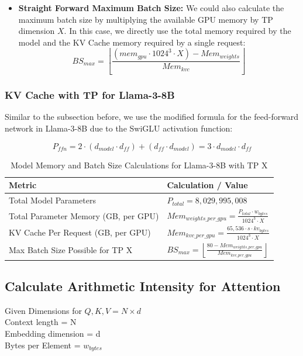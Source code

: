 \documentclass{article}
\begin{document}
\begin{itemize}
    \item \textbf{Straight Forward Maximum Batch Size:} We could also calculate the maximum batch size by multiplying the available GPU memory by TP dimension $X$. In this case, we directly use the total memory required by the model and the KV Cache memory required by a single request:
    $$BS_{max} = \left\lfloor \frac{(mem_{gpu} \cdot 1024^3 \cdot X) - Mem_{weights}}{Mem_{kvc}} \right\rfloor$$
\end{itemize}

\subsubsection{KV Cache with TP for Llama-3-8B}

Similar to the subsection before, we use the modified formula for the feed-forward network in Llama-3-8B due to the SwiGLU activation function:

$$P_{ffn} = 2 \cdot (d_{model} \cdot d_{ff}) + (d_{ff} \cdot d_{model}) = 3 \cdot d_{model} \cdot d_{ff}$$


\begin{table}[h]
\centering
\renewcommand{\arraystretch}{2.2} %
\begin{tabular}{|l|l|}
\hline
\textbf{Metric} & \textbf{Calculation / Value} \\ \hline
Total Model Parameters & $P_{total} = 8,029,995,008$ \\ \hline
Total Parameter Memory (GB, per GPU) & $\displaystyle Mem_{weights\_per\_gpu} = \frac{P_{total} \cdot w_{bytes}}{1024^3 \cdot X}$ \\ \hline
KV Cache Per Request (GB, per GPU) & $\displaystyle Mem_{kvc\_per\_gpu} = \frac{65,536 \cdot s \cdot kv_{bytes}}{1024^3 \cdot X}$ \\ \hline
Max Batch Size Possible for TP X & $\displaystyle BS_{max} = \left\lfloor \frac{80 - Mem_{weights\_per\_gpu}}{Mem_{kvc\_per\_gpu}} \right\rfloor$ \\ \hline
\end{tabular}
\caption{Model Memory and Batch Size Calculations for Llama-3-8B with TP X}
\end{table}

\subsection{Calculate Arithmetic Intensity for Attention}

Given Dimensions for $Q, K, V = N \times d$ \\
Context length = N \\
Embedding dimension = d \\
Bytes per Element = $w_{bytes}$
\end{document}
